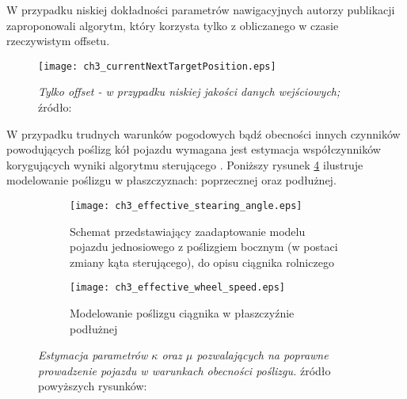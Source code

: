 W przypadku niskiej dokładności parametrów nawigacyjnych autorzy publikacji \cite{CCTA_943_950}
zaproponowali algorytm, który korzysta tylko z obliczanego w czasie rzeczywistym offsetu.
\begin{figure}[H]
\centering
\texttt{[image: ch3\_currentNextTargetPosition.eps]}
\caption{\textit{Tylko offset - w przypadku niskiej jakości danych wejściowych;}\\
	źródło: \cite[][strona 947]{CCTA_943_950}}
\label{fig:ch3_currentNextTargetPosition}
\end{figure}

\indent W przypadku trudnych warunków pogodowych bądź obecności innych czynników powodujących poślizg kół pojazdu wymagana 
jest estymacja współczynników korygujących wyniki algorytmu sterującego \cite[]{KRAUS}. Poniższy rysunek \ref{fig:side_forward_slip} ilustruje modelowanie 
poślizgu w płaszczyznach: poprzecznej oraz podłużnej.

\begin{figure}[H]
\centering
\begin{subfigure}{.4\textwidth}
  \centering
  \texttt{[image: ch3\_effective\_stearing\_angle.eps]}
  \caption{Schemat przedstawiający zaadaptowanie modelu pojazdu jednosiowego z poślizgiem bocznym (w postaci zmiany kąta sterującego), do opisu ciągnika rolniczego}
  \label{fig:side_slip}
\end{subfigure}
\hspace{2cm}
\begin{subfigure}{.4\textwidth}
  \centering
  \texttt{[image: ch3\_effective\_wheel\_speed.eps]}
  \caption{Modelowanie poślizgu ciągnika w płaszczyźnie podłużnej}
  \label{fig:longitudinal_slip}
\end{subfigure}
\caption{\textit{Estymacja parametrów $\kappa$ oraz $\mu$ pozwalających na poprawne prowadzenie pojazdu w warunkach obecności poślizgu.}
źródło powyższych rysunków: \cite[][strona 26]{KRAUS}}
\label{fig:side_forward_slip}
\end{figure}

